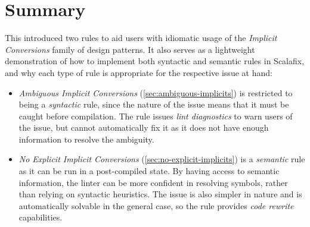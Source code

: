 \documentclass[../../main.tex]{subfiles}
\begin{document}
\section*{Summary}
This  introduced two rules to aid users with idiomatic usage of the \emph{Implicit Conversions} family of design patterns.
It also serves as a lightweight demonstration of how to implement both syntactic and semantic rules in Scalafix, and why each type of rule is appropriate for the respective issue at hand:
\begin{itemize}
  \item \emph{Ambiguous Implicit Conversions} (\cref{sec:ambiguous-implicits}) is restricted to being a \emph{syntactic} rule, since the nature of the issue means that it must be caught before compilation. The rule issues \emph{lint diagnostics} to warn users of the issue, but cannot automatically fix it as it does not have enough information to resolve the ambiguity.
  \item \emph{No Explicit Implicit Conversions} (\cref{sec:no-explicit-implicits}) is a \emph{semantic} rule as it can be run in a post-compiled state. By having access to semantic information, the linter can be more confident in resolving symbols, rather than relying on syntactic heuristics. The issue is also simpler in nature and is automatically solvable in the general case, so the rule provides \emph{code rewrite} capabilities.
\end{itemize}
\end{document}
